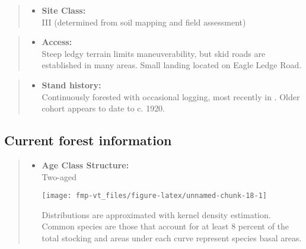 \documentclass[]{tufte-handout}
\providecommand{\tightlist}{%
  \setlength{\itemsep}{0pt}\setlength{\parskip}{0pt}}
\begin{document}
\begin{quote}
\begin{itemize}
\tightlist
\item
  \textbf{Site Class:}\\
  \vspace{2pt} III (determined from soil mapping and field assessment)
\end{itemize}
\end{quote}

\begin{quote}
\begin{itemize}
\tightlist
\item
  \textbf{Access:}\\
  \vspace{2pt} Steep ledgy terrain limits maneuverability, but skid
  roads are established in many areas. Small landing located on Eagle
  Ledge Road.
\end{itemize}
\end{quote}

\begin{quote}
\begin{itemize}
\tightlist
\item
  \textbf{Stand history:}\\
  \vspace{2pt} Continuously forested with occasional logging, most
  recently in . Older cohort appears to date to c. 1920.
\end{itemize}
\end{quote}

\subsection{Current forest
information}\label{current-forest-information-4}

\begin{quote}
\begin{itemize}
\tightlist
\item
  \textbf{Age Class Structure:}\\
  \vspace{2pt} Two-aged\\

  \begin{marginfigure}
  \texttt{[image: fmp-vt\_files/figure-latex/unnamed-chunk-18-1]} \caption[Distributions are approximated with kernel density estimation]{Distributions are approximated with kernel density estimation. Common species are those that account for at least 8 percent of the total stocking and areas under each curve represent species basal areas.}\label{fig:unnamed-chunk-18}
  \end{marginfigure}
\end{itemize}
\end{quote}
\end{document}
